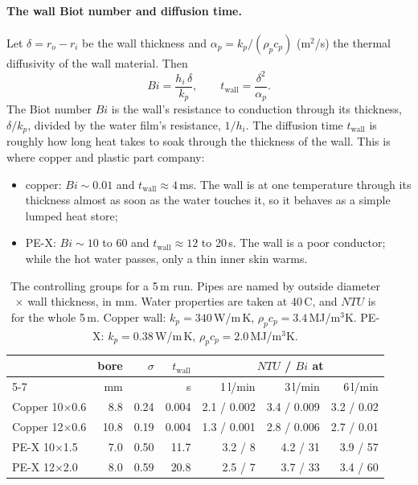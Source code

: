 \documentclass[a4paper,justified]{tufte-handout}
\newcommand{\degC}{\,\textdegree{}C}
\newcommand{\lpm}{\,l/min}
\begin{document}
\paragraph{The wall Biot number and diffusion time.} Let $\delta=r_o-r_i$ be
the wall thickness and $\alpha_p=k_p/(\rho_p c_p)$ (m$^2$/s) the thermal
diffusivity of the wall material. Then
\begin{equation}
  Bi = \frac{h_i\,\delta}{k_p},\qquad t_{\text{wall}}=\frac{\delta^2}{\alpha_p}.
\end{equation}
The Biot number $Bi$ is the wall's resistance to conduction through its
thickness, $\delta/k_p$, divided by the water film's resistance, $1/h_i$. The
diffusion time $t_{\text{wall}}$ is roughly how long heat takes to soak through
the thickness of the wall. This is where copper and plastic part company:
\begin{itemize}
  \item copper: $Bi\sim0.01$ and $t_{\text{wall}}\approx4$\,ms. The wall is at
    one temperature through its thickness almost as soon as the water touches
    it, so it behaves as a simple lumped heat store;
  \item PE-X: $Bi\sim10$ to 60 and $t_{\text{wall}}\approx12$ to 20\,s. The
    wall is a poor conductor; while the hot water passes, only a thin inner skin
    warms.
\end{itemize}

\begin{table}[h]
\centering
\footnotesize
\begin{tabular}{@{}lrrrrrr@{}}
\toprule
 & bore & $\sigma$ & $t_{\text{wall}}$ & \multicolumn{3}{c}{$NTU$ / $Bi$ at} \\
 \cmidrule(l){5-7}
 & mm & & s & 1\lpm{} & 3\lpm{} & 6\lpm{} \\
\midrule
Copper 10$\times$0.6 & 8.8 & 0.24 & 0.004 & 2.1 / 0.002 & 3.4 / 0.009 & 3.2 / 0.02 \\
Copper 12$\times$0.6 & 10.8 & 0.19 & 0.004 & 1.3 / 0.001 & 2.8 / 0.006 & 2.7 / 0.01 \\
PE-X 10$\times$1.5 & 7.0 & 0.50 & 11.7 & 3.2 / 8 & 4.2 / 31 & 3.9 / 57 \\
PE-X 12$\times$2.0 & 8.0 & 0.59 & 20.8 & 2.5 / 7 & 3.7 / 33 & 3.4 / 60 \\
\bottomrule
\end{tabular}
\caption{The controlling groups for a 5\,m run. Pipes are named by outside
diameter $\times$ wall thickness, in mm. Water properties are taken at
40\degC{}, and $NTU$ is for the whole 5\,m. Copper wall: $k_p=340$\,W/m\,K,
$\rho_pc_p=3.4$\,MJ/m$^3$K. PE-X: $k_p=0.38$\,W/m\,K,
$\rho_pc_p=2.0$\,MJ/m$^3$K.}
\label{tab:groups}
\end{table}
\end{document}
